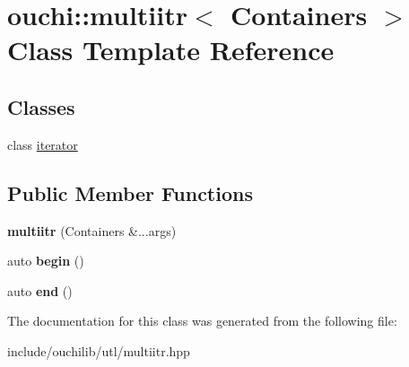 \hypertarget{classouchi_1_1multiitr}{}\section{ouchi\+::multiitr$<$ Containers $>$ Class Template Reference}
\label{classouchi_1_1multiitr}
\subsection*{Classes}
\begin{DoxyCompactItemize}
\item 
class \mbox{\hyperlink{classouchi_1_1multiitr_1_1iterator}{iterator}}
\end{DoxyCompactItemize}
\subsection*{Public Member Functions}
\begin{DoxyCompactItemize}
\item 
\mbox{\label{classouchi_1_1multiitr_af11447b1bed116fd47bb15850f777693}} 
{\bfseries multiitr} (Containers \&...args)
\item 
\mbox{\label{classouchi_1_1multiitr_a9be0b89441fd50b10edb652edf967f98}} 
auto {\bfseries begin} ()
\item 
\mbox{\label{classouchi_1_1multiitr_abf5e80051c0c50e83dc922074ae90847}} 
auto {\bfseries end} ()
\end{DoxyCompactItemize}


The documentation for this class was generated from the following file\+:\begin{DoxyCompactItemize}
\item 
include/ouchilib/utl/multiitr.\+hpp\end{DoxyCompactItemize}
